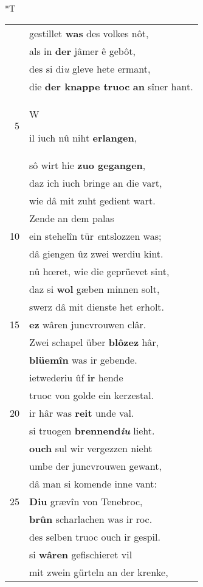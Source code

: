 \documentclass[8pt,a4paper,notitlepage]{article}
\begin{document}
\begin{table}[ht]
\begin{minipage}[t]{0.5\linewidth}
\small
\begin{center}*T
\end{center}
\begin{tabular}{rl}
 & gestillet \textbf{was} des volkes nôt,\\ 
 & als in \textbf{der} jâmer ê gebôt,\\ 
 & des si di\textit{u} gleve hete ermant,\\ 
 & die \textbf{der knappe truoc} \textbf{an} sîner hant.\\ 
5 & \begin{large}W\end{large}il iuch nû niht \textbf{erlangen},\\ 
 & sô wirt hie \textbf{zuo gegangen},\\ 
 & daz ich iuch bringe an die vart,\\ 
 & wie dâ mit zuht gedient wart.\\ 
 & Zende an dem palas\\ 
10 & ein stehelîn tür \textit{e}ntslozzen was;\\ 
 & dâ giengen ûz zwei werdiu kint.\\ 
 & nû hœret, wie die geprüevet sint,\\ 
 & daz si \textbf{wol} gæben minnen solt,\\ 
 & swerz dâ mit dienste het erholt.\\ 
15 & \textbf{ez} wâren juncvrouwen clâr.\\ 
 & Zwei schapel über \textbf{blôzez} hâr,\\ 
 & \textbf{blüemîn} was ir gebende.\\ 
 & ietwederiu ûf \textbf{ir} hende\\ 
 & truoc von golde ein kerzestal.\\ 
20 & ir hâr was \textbf{reit} unde val.\\ 
 & si truogen \textbf{brennend\textit{iu}} lieht.\\ 
 & \textbf{ouch} sul wir vergezzen nieht\\ 
 & umbe der juncvrouwen gewant,\\ 
 & dâ man si komende inne vant:\\ 
25 & \textbf{Diu} grævîn von Tenebroc,\\ 
 & \textbf{brûn} scharlachen was ir roc.\\ 
 & des selben truoc ouch ir gespil.\\ 
 & si \textbf{wâren} gefischieret vil\\ 
 & mit zwein gürteln an der krenke,\\ 

\end{tabular}
\end{minipage}
\end{table}
\end{document}
